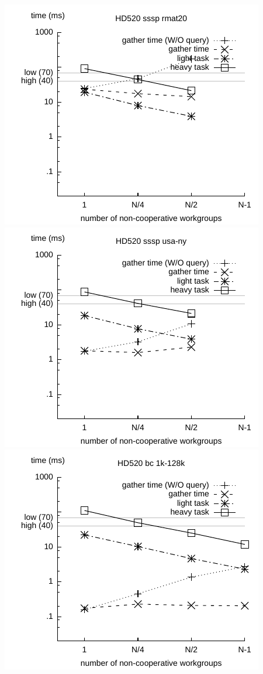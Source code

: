 \documentclass[parskip=half,sigconf,review, anonymous=true, acmcopyrightmode=none]{acmart}
\begin{document}
\includegraphics[width=.7\columnwidth]{images/barrier/hd520_sssp_rmat20.pdf} \\
\includegraphics[width=.7\columnwidth]{images/barrier/hd520_sssp_usa_ny.pdf} \\
\includegraphics[width=.7\columnwidth]{images/barrier/hd520_bc_1k_128k.pdf} \\
\end{document}
